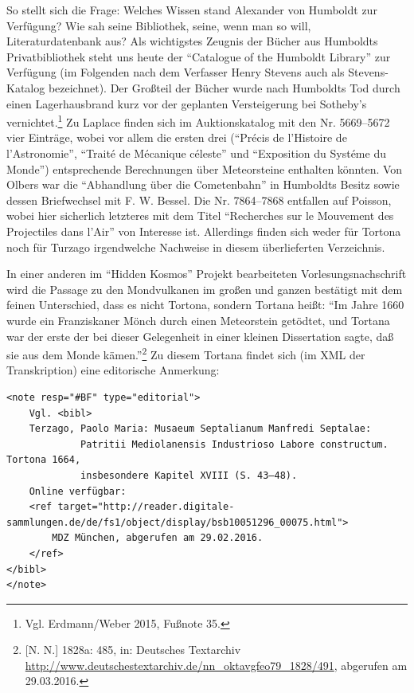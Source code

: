 \documentclass[a4paper,
fontsize=11pt,
oneside,
numbers=noperiodatend,
parskip=half-,
bibliography=totoc,
final
]{scrartcl}
\begin{document}
So stellt sich die Frage: Welches Wissen stand Alexander von Humboldt
zur Verfügung? Wie sah seine Bibliothek, seine, wenn man so will,
Literaturdatenbank aus? Als wichtigstes Zeugnis der Bücher aus Humboldts
Privatbibliothek steht uns heute der \enquote{Catalogue of the Humboldt
Library} zur Verfügung (im Folgenden nach dem Verfasser Henry Stevens
auch als Stevens-Katalog bezeichnet). Der Großteil der Bücher wurde nach
Humboldts Tod durch einen Lagerhausbrand kurz vor der geplanten
Versteigerung bei Sotheby's vernichtet.\footnote{Vgl. Erdmann/Weber
  2015, Fußnote 35.} Zu Laplace finden sich im Auktionskatalog mit den
Nr. 5669--5672 vier Einträge, wobei vor allem die ersten drei
(\enquote{Précis de l'Histoire de l'Astronomie}, \enquote{Traité de
Mécanique céleste} und \enquote{Exposition du Systéme du Monde})
entsprechende Berechnungen über Meteorsteine enthalten könnten. Von
Olbers war die \enquote{Abhandlung über die Cometenbahn} in Humboldts
Besitz sowie dessen Briefwechsel mit F. W. Bessel. Die Nr. 7864--7868
entfallen auf Poisson, wobei hier sicherlich letzteres mit dem Titel
\enquote{Recherches sur le Mouvement des Projectiles dans l'Air} von
Interesse ist. Allerdings finden sich weder für Tortona noch für Turzago
irgendwelche Nachweise in diesem überlieferten Verzeichnis.

In einer anderen im \enquote{Hidden Kosmos} Projekt bearbeiteten
Vorlesungsnachschrift wird die Passage zu den Mondvulkanen im großen und
ganzen bestätigt mit dem feinen Unterschied, dass es nicht Tortona,
sondern Tortana heißt: \enquote{Im Jahre 1660 wurde ein Franziskaner
Mönch durch einen Meteorstein getödtet, und Tortana war der erste der
bei dieser Gelegenheit in einer kleinen Dissertation sagte, daß sie aus
dem Monde kämen.}\footnote{{[}N. N.{]} 1828a: 485, in: Deutsches
  Textarchiv
  \url{http://www.deutschestextarchiv.de/nn_oktavgfeo79_1828/491},
  abgerufen am 29.03.2016.} Zu diesem Tortana findet sich (im XML der
Transkription) eine editorische Anmerkung:

\begin{scriptsize}
\begin{verbatim}
<note resp="#BF" type="editorial">
    Vgl. <bibl>
    Terzago, Paolo Maria: Musaeum Septalianum Manfredi Septalae: 
             Patritii Mediolanensis Industrioso Labore constructum. Tortona 1664, 
             insbesondere Kapitel XVIII (S. 43–48).
    Online verfügbar: 
    <ref target="http://reader.digitale-sammlungen.de/de/fs1/object/display/bsb10051296_00075.html">
        MDZ München, abgerufen am 29.02.2016.
    </ref>
</bibl>
</note>
\end{verbatim}
\end{scriptsize}
\end{document}
